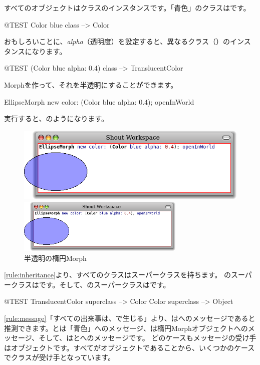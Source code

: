 \documentclass[a4paper,10pt,twoside]{book}
\begin{document}
\noindent
すべてのオブジェクトはクラスのインスタンスです。「青色」のクラスはです。
\begin{code}{@TEST}
Color blue class --> Color
\end{code}

\noindent
おもしろいことに、\emph{alpha}（透明度）を設定すると、異なるクラス（）のインスタンスになります。
\begin{code}{@TEST}
(Color blue alpha: 0.4) class --> TranslucentColor
\end{code}

\noindent
Morphを作って、それを半透明にすることができます。
\begin{code}{}
EllipseMorph new color: (Color blue alpha: 0.4); openInWorld
\end{code}
\noindent
実行すると、のようになります。

\begin{center}
\begin{figure}[!ht]
\ifluluelse
	{\centerline {\includegraphics[scale=0.7]{TranslucentEllipse}}}
	{\centerline {\includegraphics[width=8cm]{TranslucentEllipse}}}
\caption{半透明の楕円Morph}
\end{figure}
\end{center}

\ref{rule:inheritance}より、すべてのクラスはスーパークラスを持ちます。
のスーパークラスはです。そして、のスーパークラスはです。
\begin{code}{@TEST}
TranslucentColor superclass --> Color
Color superclass                   --> Object
\end{code}

\ref{rule:message}「すべての出来事は、で生じる」より、はへのメッセージであると推測できます。とは「青色」へのメッセージ、は楕円Morphオブジェクトへのメッセージ、そして、はとへのメッセージです。
どのケースもメッセージの受け手はオブジェクトです。すべてがオブジェクトであることから、いくつかのケースでクラスが受け手となっています。
\end{document}
